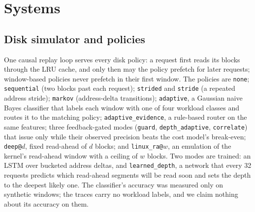 
\section{Systems}\label{sec:systems}

\subsection{Disk simulator and policies}\label{sec:systems-disk}
One causal replay loop serves every disk policy: a request first reads its
blocks through the LRU cache, and only then may the policy prefetch for later
requests; window-based policies never prefetch in their first window. The
policies are \texttt{none}; \texttt{sequential} (two blocks past each
request); \texttt{strided} and \texttt{stride} (a repeated address stride);
\texttt{markov} (address-delta transitions); \texttt{adaptive}, a Gaussian
naive Bayes classifier that labels each window with one of four workload
classes and routes it to the matching policy; \texttt{adaptive\_evidence}, a
rule-based router on the same features; three feedback-gated modes
(\texttt{guard}, \texttt{depth\_adaptive}, \texttt{correlate}) that issue only
while their observed precision beats the cost model's break-even;
\texttt{deep@}$d$, fixed read-ahead of $d$ blocks; and \texttt{linux\_ra@}$w$,
an emulation of the kernel's read-ahead window with a ceiling of $w$ blocks.
Two modes are trained: an LSTM over bucketed address deltas, and
\texttt{learned\_depth}, a network that every 32 requests predicts which
read-ahead segments will be read soon and sets the depth to the deepest likely
one. The classifier's accuracy was measured only on synthetic windows; the
traces carry no workload labels, and we claim nothing about its accuracy on
them.

